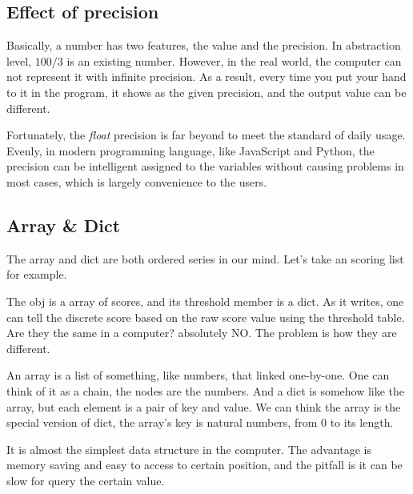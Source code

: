 \subsection{Effect of precision}

Basically, a number has two features, the value and the precision.
In abstraction level, $100/3$ is an existing number.
However, in the real world, the computer can not represent it with infinite precision.
As a result, every time you put your hand to it in the program,
it shows as the given precision,
and the output value can be different.



Fortunately, the \emph{float} precision is far beyond to meet the standard of daily usage.
Evenly, in modern programming language, like JavaScript and Python,
the precision can be intelligent assigned to the variables without causing problems in most cases,
which is largely convenience to the users.

\subsection{Array \& Dict}

The array and dict are both ordered series in our mind.
Let's take an scoring list for example.



The obj is a array of scores,
and its threshold member is a dict.
As it writes,
one can tell the discrete score based on the raw score value using the threshold table.
Are they the same in a computer?
absolutely NO.
The problem is how they are different.

An array is a list of something, like numbers, that linked one-by-one.
One can think of it as a chain,
the nodes are the numbers.
And a dict is somehow like the array,
but each element is a pair of key and value.
We can think the array is the special version of dict,
the array's key is natural numbers, from 0 to its length.

It is almost the simplest data structure in the computer.
The advantage is memory saving and easy to access to certain position,
and the pitfall is it can be slow for query the certain value.



